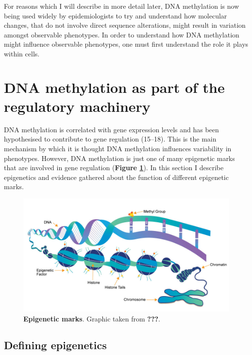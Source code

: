 \documentclass[11pt,oneside]{bristolthesis}
\begin{document}
For reasons which I will describe in more detail later, DNA methylation is now being used widely by epidemiologists to try and understand how molecular changes, that do not involve direct sequence alterations, might result in variation amongst observable phenotypes. In order to understand how DNA methylation might influence observable phenotypes, one must first understand the role it plays within cells.

\hypertarget{dnam-as-part-of-regulation}{%
\section{DNA methylation as part of the regulatory machinery}\label{dnam-as-part-of-regulation}}

DNA methylation is correlated with gene expression levels and has been hypothesised to contribute to gene regulation (15--18). This is the main mechanism by which it is thought DNA methylation influences variability in phenotypes. However, DNA methylation is just one of many epigenetic marks that are involved in gene regulation (\textbf{Figure \ref{fig:epigenetic-marks}}). In this section I describe epigenetics and evidence gathered about the function of different epigenetic marks.




\begin{figure}

{\centering \includegraphics[width=1\linewidth]{figure/01-introduction/epigenetic-marks} 

}

\caption[Epigenetic marks]{\textbf{Epigenetic marks}. Graphic taken from \textbf{???}.}\label{fig:epigenetic-marks}
\end{figure}
\hypertarget{defining-epigenetics}{%
\subsection{Defining epigenetics}\label{defining-epigenetics}}
\end{document}
